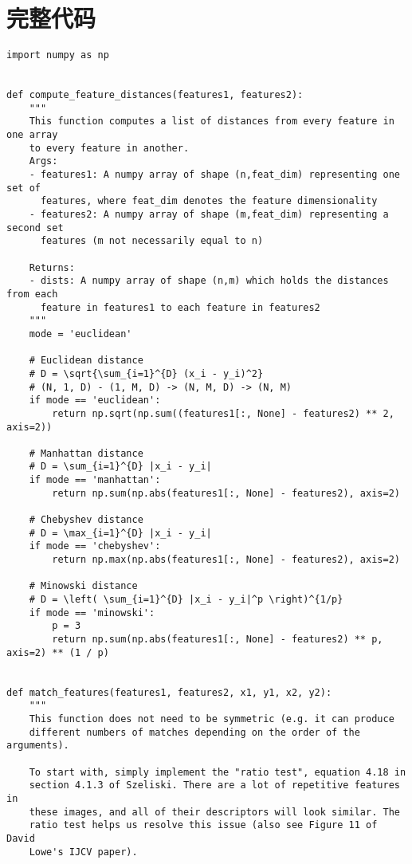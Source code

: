 \appendix

\section{完整代码}

\label{appendix:code}

\begin{lstlisting}[style=Python]
import numpy as np


def compute_feature_distances(features1, features2):
    """
    This function computes a list of distances from every feature in one array
    to every feature in another.
    Args:
    - features1: A numpy array of shape (n,feat_dim) representing one set of
      features, where feat_dim denotes the feature dimensionality
    - features2: A numpy array of shape (m,feat_dim) representing a second set
      features (m not necessarily equal to n)

    Returns:
    - dists: A numpy array of shape (n,m) which holds the distances from each
      feature in features1 to each feature in features2
    """
    mode = 'euclidean'

    # Euclidean distance
    # D = \sqrt{\sum_{i=1}^{D} (x_i - y_i)^2}
    # (N, 1, D) - (1, M, D) -> (N, M, D) -> (N, M)
    if mode == 'euclidean':
        return np.sqrt(np.sum((features1[:, None] - features2) ** 2, axis=2))

    # Manhattan distance
    # D = \sum_{i=1}^{D} |x_i - y_i|
    if mode == 'manhattan':
        return np.sum(np.abs(features1[:, None] - features2), axis=2)

    # Chebyshev distance
    # D = \max_{i=1}^{D} |x_i - y_i|
    if mode == 'chebyshev':
        return np.max(np.abs(features1[:, None] - features2), axis=2)
    
    # Minowski distance
    # D = \left( \sum_{i=1}^{D} |x_i - y_i|^p \right)^{1/p}
    if mode == 'minowski':
        p = 3
        return np.sum(np.abs(features1[:, None] - features2) ** p, axis=2) ** (1 / p)


def match_features(features1, features2, x1, y1, x2, y2):
    """
    This function does not need to be symmetric (e.g. it can produce
    different numbers of matches depending on the order of the arguments).

    To start with, simply implement the "ratio test", equation 4.18 in
    section 4.1.3 of Szeliski. There are a lot of repetitive features in
    these images, and all of their descriptors will look similar. The
    ratio test helps us resolve this issue (also see Figure 11 of David
    Lowe's IJCV paper).


\end{lstlisting}
